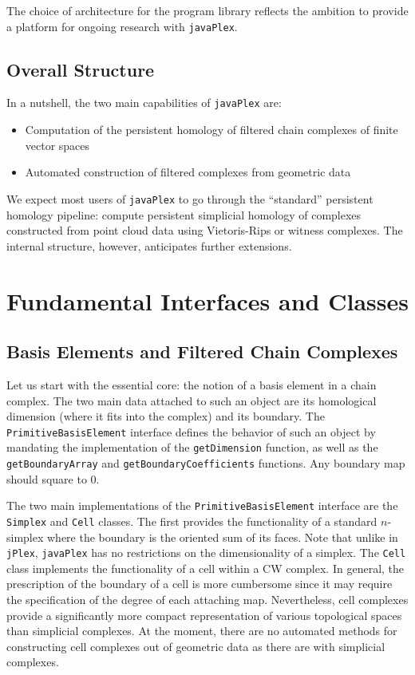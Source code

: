 \documentclass[11pt]{amsart}
\newcommand\jPlex{\texttt{jPlex}\xspace}
\newcommand\javaPlex{\texttt{javaPlex}\xspace}
\begin{document}
The choice of architecture for the program library reflects the ambition to provide a platform for ongoing research with \javaPlex. 

\subsection{Overall Structure}

In a nutshell, the two main capabilities of \javaPlex are:
\begin{itemize}
\item Computation of the persistent homology of filtered chain complexes of finite vector spaces
\item Automated construction of filtered complexes from geometric data 
\end{itemize}

We expect most users of \javaPlex to go through the ``standard'' persistent homology pipeline: compute persistent simplicial homology of complexes constructed from point cloud data using Vietoris-Rips or witness complexes. The internal structure, however, anticipates further extensions.

\section{Fundamental Interfaces and Classes}
\subsection{Basis Elements and Filtered Chain Complexes}

Let us start with the essential core: the notion of a basis element in a chain complex. The two main data attached to such an object are its homological dimension (where it fits into the complex) and its boundary. The  \texttt{Primitive\-Basis\-Element} interface defines the behavior of such an object by mandating the implementation of the  \texttt{getDimension} function, as well as the  \texttt{get\-Boundary\-Array} and \texttt{get\-Boundary\-Coefficients} functions. Any boundary map should square to 0.

The two main implementations of the  \texttt{Primitive\-Basis\-Element} interface are the  \texttt{Simplex} and  \texttt{Cell} classes. The first provides the functionality of a standard $n$-simplex where the boundary is the oriented sum of its faces. Note that unlike in \jPlex, \javaPlex has no restrictions on the dimensionality of a simplex. The  \texttt{Cell} class implements the functionality of a cell within a CW complex. In general, the prescription of the boundary of a cell is more cumbersome since it may require the specification of the degree of each attaching map. Nevertheless, cell complexes provide a significantly more compact representation of various topological spaces than simplicial complexes. At the moment, there are no automated methods for constructing cell complexes out of geometric data as there are with simplicial complexes.
\end{document}
